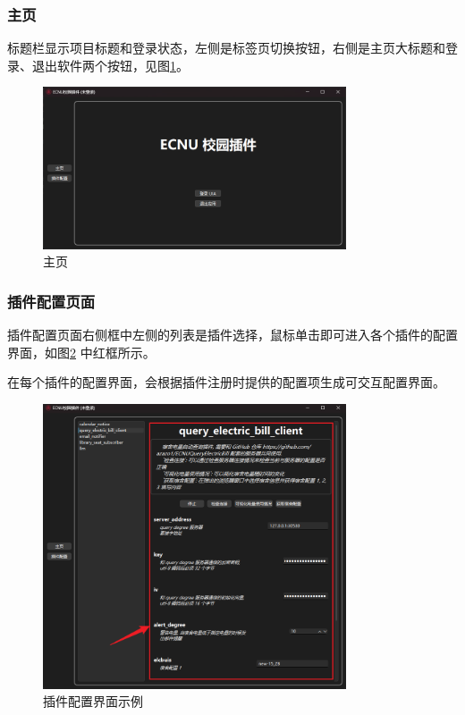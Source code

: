 \subsubsection{主页}

标题栏显示项目标题和登录状态，左侧是标签页切换按钮，右侧是主页大标题和登录、退出软件两个按钮，见图\ref{fig:home}。

\begin{figure}
    \centering
    \includegraphics[width=0.8\textwidth]{img/home}
    \caption{主页}
    \label{fig:home}
\end{figure}

\subsubsection{插件配置页面}\label{subsubsec:gui-plugin-config}

插件配置页面右侧框中左侧的列表是插件选择，鼠标单击即可进入各个插件的配置界面，如图\ref{fig:plugin-config-gui} 中红框所示。

在每个插件的配置界面，会根据插件注册时提供的配置项生成可交互配置界面。

\begin{figure}
    \centering
    \includegraphics[width=0.8\textwidth]{img/plugin_config_gui}
    \caption{插件配置界面示例}
    \label{fig:plugin-config-gui}
\end{figure}

